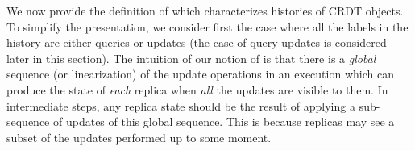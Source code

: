 We now provide the definition of \crdtlin{} which characterizes histories of CRDT objects.
To simplify the presentation, we consider first the case where all the labels in the history are
either queries or updates (the case of query-updates is considered later in this section).
%
%
%
The intuition of our notion of \crdtlin{} is that there is a \emph{global} sequence
(or linearization) of the update operations in an execution which can
produce the state of \emph{each} replica when \emph{all} the updates are visible to them.
In intermediate steps, any replica state should be the result of applying a sub-sequence of updates
of this global sequence. This is because replicas may see a subset of the updates
performed up to some moment.
